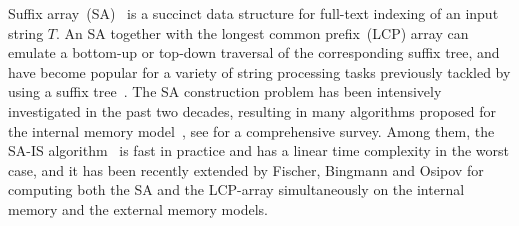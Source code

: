 \documentclass[10pt,journal,compsoc]{IEEEtran}
\begin{document}
\begin{CJK*}{GBK}{song}
\maketitle


\IEEEdisplaynontitleabstractindextext



%
\IEEEpeerreviewmaketitle



{

Suffix array~(SA)~\cite{Manber1993} is a succinct data structure for full-text indexing of an input string $T$. An SA together with the longest common prefix~(LCP) array can emulate a bottom-up or top-down traversal of the corresponding suffix tree, and have become popular for a variety of string processing tasks previously tackled by using a suffix tree~\cite{Abouelhodaa2004}. The SA construction problem has been intensively investigated in the past two decades, resulting in many algorithms proposed for the internal memory model~\cite{Burkhardt2003,Manzini2004,Schurmann2007, Ko2003, Kim2004, Karkkainen2003,nong2011}, see \cite{Puglisi2007} for a comprehensive survey. Among them, the SA-IS algorithm~\cite{nong2011} is fast in practice and has a linear time complexity in the worst case, and it has been recently extended by Fischer, Bingmann and Osipov \cite{Fischer11,Bingmann12} for computing both the SA and the LCP-array simultaneously on the internal memory and the external memory models.

}
\end{CJK*}
\end{document}
